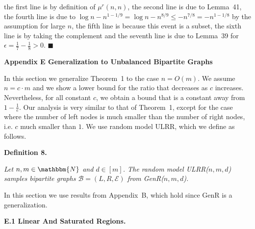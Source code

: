 the first line is by definition of $\mu^{r}(n,n)$, the second line is due to Lemma 41, the fourth line is due to $\log{n}-n^{1-1/9}=\log{n}-n^{8/9}\leq-n^{7/8}=-n^{1-1/8}$ by the assumption for large $n$, the fifth line is because this event is a subset, the sixth line is by taking the complement and the seventh line is due to Lemma 39 for $\epsilon=\frac{1}{7}-\frac{1}{8}>0$.
\ensuremath{\blacksquare}\par






\par\medskip\noindent\textbf{Appendix E Generalization to Unbalanced Bipartite Graphs}\par




In this section we generalize Theorem 1 to the case $n=O(m)$. We assume $n=c\cdot m$ and we show a lower bound for the ratio that decreases as $c$ increases. Nevertheless, for all constant $c$, we obtain a bound that is a constant away from $1-\frac{1}{e}$.
Our analysis is very similar to that of Theorem 1, except for the case where the number of left nodes is much smaller than the number of right nodes, i.e. $c$ much smaller than $1$.
We use random model ULRR, which we define as follows.\par





\par\medskip\noindent\textbf{\textbf{Definition 8}\textbf{.}}\par



\emph{Let $n,m\in\mathbbm{N}$ and $d\in[m]$. The random model ULRR($n,m,d$) samples bipartite graphs $\mathcal{B}=(L,R,\mathcal{E})$ from GenR($n,m,d$).}\par






In this section we use results from Appendix B, which hold since GenR is a generalization.\par




\par\medskip\noindent\textbf{E.1 Linear And Saturated Regions.}\par





